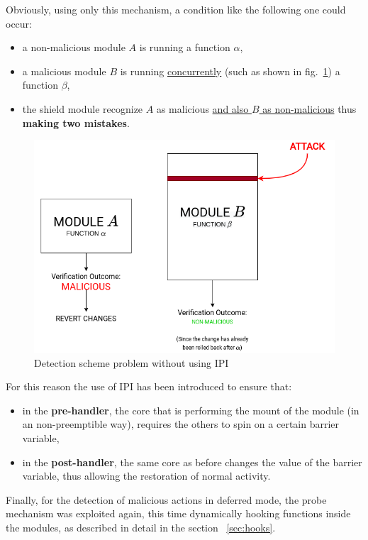 \documentclass{article}
\begin{document}
	Obviously, using only this mechanism, a condition like the following one could occur:
	\begin{itemize}
		\item a non-malicious module $A$ is running a function $\alpha$,
		\item a malicious module $B$ is running \ul{concurrently} (such as shown in fig.~\ref{fig:concurrency}) a
		function $\beta$,
		\item the shield module recognize $A$ as malicious \ul{and also $B$ as non-malicious} thus \textbf{making two
		mistakes}.
	\end{itemize}

	\begin{figure}[!htbp]
		\centering
		\includegraphics[scale=0.4]{concurrency}
		\caption{Detection scheme problem without using IPI}
		\label{fig:concurrency}
	\end{figure}

	For this reason the use of IPI has been introduced to ensure that:
	\begin{itemize}
		\item in the \textbf{pre-handler}, the core that is performing the mount of the module (in an non-preemptible
		way), requires the others to spin on a certain barrier variable,
		\item in the \textbf{post-handler}, the same core as before changes the value of the barrier variable, thus
		allowing the restoration of normal activity.
	\end{itemize}

	Finally, for the detection of malicious actions in deferred mode, the probe mechanism was exploited again, this
	time dynamically hooking functions inside the modules, as described in detail in the section ~\ref{sec:hooks}.
\end{document}
